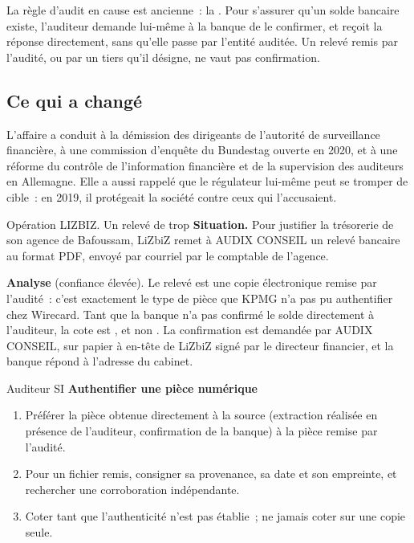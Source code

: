 La règle d'audit en cause est ancienne~: la . Pour s'assurer qu'un solde bancaire
existe, l'auditeur demande lui-même à la banque de le confirmer, et reçoit
la réponse directement, sans qu'elle passe par l'entité auditée. Un relevé
remis par l'audité, ou par un tiers qu'il désigne, ne vaut pas
confirmation.

\subsection{Ce qui a changé}

L'affaire a conduit à la démission des dirigeants de l'autorité de
surveillance financière, à une commission d'enquête du Bundestag ouverte en
2020, et à une réforme du contrôle de l'information financière et de la
supervision des auditeurs en Allemagne. Elle a aussi rappelé que le
régulateur lui-même peut se tromper de cible~: en 2019, il protégeait la
société contre ceux qui l'accusaient.

\begin{boxscenario}{Opération LIZBIZ. Un relevé de trop}
\textbf{Situation.} Pour justifier la trésorerie de son agence de
Bafoussam, LiZbiZ remet à AUDIX CONSEIL un relevé bancaire au format PDF,
envoyé par courriel par le comptable de l'agence.

\medskip
\textbf{Analyse} (confiance élevée). Le relevé est une copie électronique
remise par l'audité~: c'est exactement le type de pièce que KPMG n'a pas
pu authentifier chez Wirecard. Tant que la banque n'a pas confirmé le
solde directement à l'auditeur, la cote est \NEK{}, et non \OUI{}. La
confirmation est demandée par AUDIX CONSEIL, sur papier à en-tête de
LiZbiZ signé par le directeur financier, et la banque répond à l'adresse du
cabinet.
\end{boxscenario}

\begin{boxmetier}{Auditeur SI}
\textbf{Authentifier une pièce numérique}
\begin{enumerate}
    \item Préférer la pièce obtenue directement à la source (extraction
          réalisée en présence de l'auditeur, confirmation de la banque) à
          la pièce remise par l'audité.
    \item Pour un fichier remis, consigner sa provenance, sa date et son
          empreinte, et rechercher une corroboration indépendante.
    \item Coter \NEK{} tant que l'authenticité n'est pas établie~; ne
          jamais coter \OUI{} sur une copie seule.
\end{enumerate}
\end{boxmetier}

